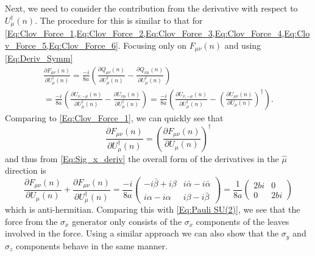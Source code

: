 	Next, we need to consider the contribution from the derivative with respect to
	$U^\dagger_\mu(n)$. The procedure for this is similar to that for 
	\cref{Eq:Clov_Force_1,Eq:Clov_Force_2,Eq:Clov_Force_3,Eq:Clov_Force_4,Eq:Clov_Force_5,Eq:Clov_Force_6}.
	Focusing only on $F_{\mu\nu}(n)$ and using \cref{Eq:Deriv_Symm}
	\begin{multline}\label{Eq:Clover_deriv_dag}
		\frac{\partial F_{\mu\nu}(n)}{\partial U^\dagger_\mu(n)}=
		\frac{-i}{8a}\left(\frac{\partial Q_{\mu\nu}(n)} {\partial U^\dagger_\mu(n)}
		-\frac{\partial Q_{\nu\mu}(n)}{\partial U^\dagger_\mu(n)}\right)\\
		=\frac{-i}{8a}\left(\frac{\partial U_{\nu,-\mu}(n)}{\partial U^\dagger_\mu(n)}-
			\frac{\partial U_{\nu\mu}(n)}{\partial U^\dagger_\mu(n)}\right)
		=\frac{-i}{8a}\left(\frac{\partial U_{\nu,-\mu}(n)}{\partial U^\dagger_\mu(n)}-
			\left(\frac{\partial U_{\mu\nu}(n)}{\partial U_\mu(n)}\right)^\dagger\right)\text{.}
	\end{multline}
	Comparing to \cref{Eq:Clov_Force_1}, we can quickly see that
	\begin{equation}\label{Eq:NoDag_vs_Dag}
		\frac{\partial F_{\mu\nu}(n)}{\partial U^\dagger_\mu(n)}=
		\left(\frac{\partial F_{\mu\nu}(n)}{\partial U_\mu(n)}\right)^\dagger
	\end{equation}
	and thus from \cref{Eq:Sig_x_deriv} the overall form of the derivatives in the $\hat{\mu}$ direction is
	\begin{equation}\label{Eq:Final_Clov_Form}
		\frac{\partial F_{\mu\nu}(n)}{\partial U_\mu(n)}+
		\frac{\partial F_{\mu\nu}(n)}{\partial U^\dagger_\mu(n)}=
		\frac{-i}{8a}\begin{pmatrix} -i\bar{\beta} +i\beta& i\bar{\alpha}-i\bar{\alpha} \\
		i\alpha-i\alpha & i\beta-i\bar{\beta}\end{pmatrix}=
		\frac{1}{8a}\begin{pmatrix} 2bi & 0 \\ 0 & 2bi\end{pmatrix}
	\end{equation}
	which is anti-hermitian. Comparing this with \cref{Eq:Pauli SU(2)}, we see that the force from the $\sigma_x$
	generator only consists of the $\sigma_x$ components of the leaves involved in the force. Using a similar approach we
	can also show that the $\sigma_y$ and $\sigma_z$ components behave in the same manner.
